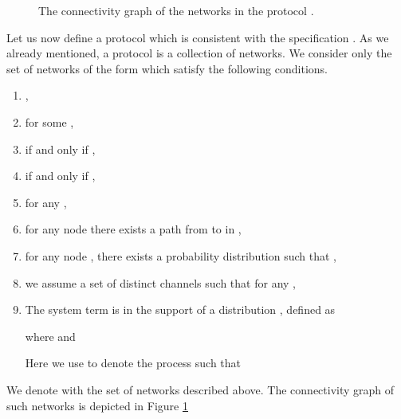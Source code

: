 \documentclass{LMCS}
\begin{document}
\begin{figure}
\caption{The connectivity graph of the networks in the protocol 
.}
\label{fig:routing.impl.conngraph}
\end{figure}

Let us now define a protocol which is consistent with 
the specification . 
As we already mentioned, a protocol is a collection of 
networks. 
We consider only the set of networks of the form 
 which satisfy the 
following conditions.

\begin{enumerate}
\item ,
\item  for some 
, 
\item  if and only if , 
\item  if and only if ,
\item  for any , 
\item for any node  there exists a path 
from  to  in ,
\item for any node , there exists a probability 
distribution  such that 
, 
\item we assume a set of distinct channels  such that 
 for any , 
\item The system term  is in the 
support of a distribution , defined as 

where  and 

Here we use  to denote the process such that 

\end{enumerate}
\noindent
We denote with  the set of networks 
 described above. The connectivity graph 
of such networks is depicted in Figure \ref{fig:routing.impl.conngraph}
\end{document}
